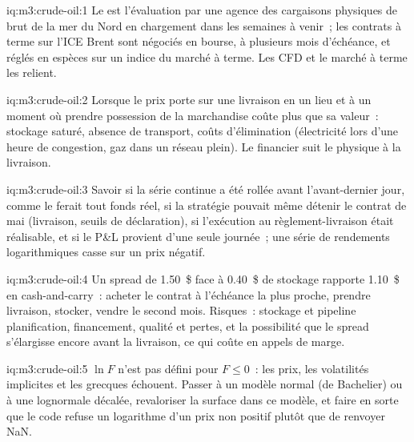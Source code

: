 \begin{solution}{iq:m3:crude-oil:1}
Le  est l'évaluation par une agence des cargaisons physiques de brut de la mer du Nord en chargement dans les
semaines à venir~; les contrats à terme sur l'ICE Brent sont négociés en bourse, à plusieurs mois d'échéance, et
réglés en espèces sur un indice du marché à terme. Les CFD et le marché
à terme les relient.
\end{solution}

\begin{solution}{iq:m3:crude-oil:2}
Lorsque le prix porte sur une livraison en un lieu et à un moment où prendre possession de la marchandise coûte
plus que sa valeur~: stockage saturé, absence de transport, coûts d'élimination (électricité lors d'une
heure de congestion, gaz dans un réseau plein). Le financier suit le physique à la livraison.
\end{solution}

\begin{solution}{iq:m3:crude-oil:3}
Savoir si la série continue a été rollée avant l'avant-dernier jour, comme le ferait tout fonds réel,
si la stratégie pouvait même détenir le contrat de mai (livraison,
seuils de déclaration), si l'exécution au règlement-livraison était réalisable, et
si le P\&L provient d'une seule journée~; une série de rendements logarithmiques casse sur un prix négatif.
\end{solution}

\begin{solution}{iq:m3:crude-oil:4}
Un spread de 1.50~\$ face à 0.40~\$ de stockage rapporte 1.10~\$ en cash-and-carry~: acheter le contrat
à l'échéance la plus proche, prendre livraison, stocker, vendre le second mois. Risques~: stockage et pipeline
planification, financement, qualité et pertes, et la possibilité que le spread s'élargisse
encore avant la livraison, ce qui coûte en appels de marge.
\end{solution}

\begin{solution}{iq:m3:crude-oil:5}
$\ln F$ n'est pas défini pour $F \le 0$~: les prix, les volatilités implicites et les grecques échouent.
Passer à un modèle normal (de Bachelier) ou à une lognormale décalée, revaloriser la surface dans
ce modèle, et faire en sorte que le code refuse un logarithme d'un prix non positif plutôt que de renvoyer
NaN.
\end{solution}

